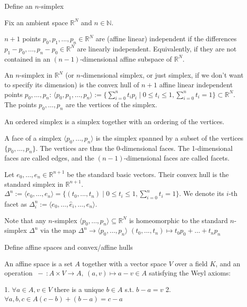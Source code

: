 Define an \( n \)-simplex

Fix an ambient space \(\mathbb{R}^N\) and \(n \in \mathbb{N}\). 

\(n+1\) points \(p_0, p_1, ... , p_n \in \mathbb{R}^N\) are (affine linear) independent if the differences \(p_1 - p_0, ... , p_n - p_0 \in \mathbb{R}^N\) are linearly independent. 
Equivalently, if they are not contained in an \((n-1)\)-dimensional affine subspace of \(\mathbb{R}^N\).

An \(n\)-simplex in \(\mathbb{R}^N\) (or \(n\)-dimensional simplex, or just simplex, if we don't want to specify its dimension) is the convex hull of \(n+1\) affine linear independent points 
\(p_0, \dots, p_n\): 
\(\langle p_0, p_1, \dots, p_n \rangle := \{ \sum_{i=0}^n t_i p_i \mid 0 \leq t_i \leq 1, \sum_{i=0}^n t_i = 1 \} \subset \mathbb{R}^N.\)
The points \(p_0, \dots, p_n\) are the vertices of the simplex.

An ordered simplex is a simplex together with an ordering of the vertices.

A face of a simplex \(\langle p_0, ... , p_n \rangle\) is the simplex spanned by a subset of the vertices \(\{ p_0, \dots, p_n \}\). The vertices are thus the 0-dimensional faces. 
The 1-dimensional faces are called edges, and the \((n-1)\)-dimensional faces are called facets.

Let \(e_0, \dots, e_n \in \mathbb{R}^{n+1}\) be the standard basic vectors. Their convex hull is the standard simplex in \(\mathbb{R}^{n+1}\).
\(\Delta^n := \langle e_0, \dots, e_n \rangle = \{ (t_0, ... , t_n) \mid 0 \leq t_i \leq 1, \sum_{i=0}^n t_i = 1 \}.\) 
We denote its \(i\)-th facet as 
\(\Delta_i^n := \langle e_0, \dots, \hat{e}_i , \dots, e_n \rangle.\)

Note that any \(n\)-simplex \(\langle p_0, \dots, p_n \rangle \subseteq \mathbb{R}^N\) is homeomorphic to the standard \(n\)-simplex \(\Delta^n\) via the map
\(\Delta^n \rightarrow \langle p_0, \dots, p_n \rangle\)
\((t_0, ... , t_n) \mapsto t_0 p_0 + \dots + t_n p_n\) 


Define affine spaces and convex/affine hulls

An affine space is a set \(A\) together with a vector space \(V\) over a field \(K\), and an operation 
\(\ -\ : A \times V \to A,\ (a, v) \mapsto a - v \in A \)
satisfying the Weyl axioms:

1. \( \forall a \in A, v \in V \) there is a unique \( b \in A \) s.t. \( b - a = v \)
2. \( \forall a, b, c \in A (c-b) + (b-a) = c-a \)

